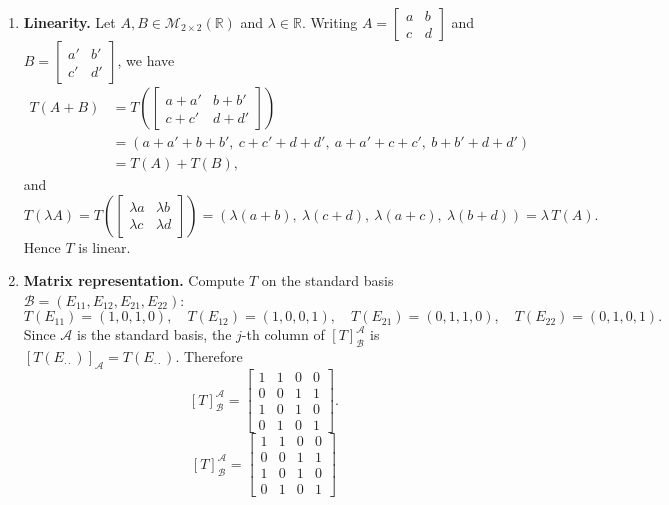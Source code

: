 \documentclass[12pt]{article}
\begin{document}
\begin{enumerate}[label=(\alph*)]
\item \textbf{Linearity.}
Let $A,B\in\mathcal{M}_{2\times 2}(\mathbb{R})$ and $\lambda\in\mathbb{R}$. Writing
$A=\begin{bmatrix}a&b\\c&d\end{bmatrix}$ and $B=\begin{bmatrix}a'&b'\\c'&d'\end{bmatrix}$, we have
\[
\begin{aligned}
T(A+B)
&=T\!\left(\begin{bmatrix}a+a'&b+b'\\c+c'&d+d'\end{bmatrix}\right)\\
&=(a+a'+b+b',\ c+c'+d+d',\ a+a'+c+c',\ b+b'+d+d')\\
&= T(A)+T(B),
\end{aligned}
\]
and
\[
T(\lambda A)=T\!\left(\begin{bmatrix}\lambda a&\lambda b\\\lambda c&\lambda d\end{bmatrix}\right)
=(\lambda(a+b),\ \lambda(c+d),\ \lambda(a+c),\ \lambda(b+d))=\lambda\,T(A).
\]
Hence $T$ is linear.

\item \textbf{Matrix representation.}
Compute $T$ on the standard basis $\mathcal{B}=(E_{11},E_{12},E_{21},E_{22})$:
\[
T(E_{11})=(1,0,1,0),\quad
T(E_{12})=(1,0,0,1),\quad
T(E_{21})=(0,1,1,0),\quad
T(E_{22})=(0,1,0,1).
\]
Since $\mathcal{A}$ is the standard basis, the $j$-th column of $[T]_{\mathcal{B}}^{\mathcal{A}}$ is $[T(E_{\cdot\cdot})]_{\mathcal{A}}=T(E_{\cdot\cdot})$. Therefore
\[
[T]_{\mathcal{B}}^{\mathcal{A}}=
\begin{bmatrix}
1&1&0&0\\
0&0&1&1\\
1&0&1&0\\
0&1&0&1
\end{bmatrix}.
\]
\[
\boxed{\, [T]_{\mathcal{B}}^{\mathcal{A}}=
\begin{bmatrix}
1&1&0&0\\
0&0&1&1\\
1&0&1&0\\
0&1&0&1
\end{bmatrix}\,}
\]


\end{enumerate}
\end{document}
